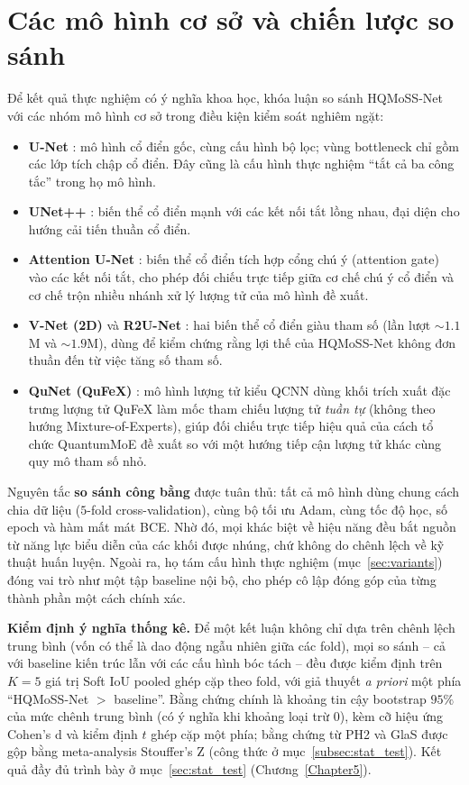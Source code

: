 \section{Các mô hình cơ sở và chiến lược so sánh}
Để kết quả thực nghiệm có ý nghĩa khoa học, khóa luận so sánh HQMoSS-Net với các nhóm mô hình cơ sở trong điều kiện kiểm soát nghiêm ngặt:
\begin{itemize}
    \item \textbf{U-Net} \cite{ronneberger2015unet}: mô hình cổ điển gốc, cùng cấu hình bộ lọc; vùng bottleneck chỉ gồm các lớp tích chập cổ điển. Đây cũng là cấu hình thực nghiệm ``tắt cả ba công tắc'' trong họ mô hình.
    \item \textbf{UNet++} \cite{zhou2018unetplusplus}: biến thể cổ điển mạnh với các kết nối tắt lồng nhau, đại diện cho hướng cải tiến thuần cổ điển.
    \item \textbf{Attention U-Net} \cite{oktay2018attention}: biến thể cổ điển tích hợp cổng chú ý (attention gate) vào các kết nối tắt, cho phép đối chiếu trực tiếp giữa cơ chế chú ý cổ điển và cơ chế trộn nhiều nhánh xử lý lượng tử của mô hình đề xuất.
    \item \textbf{V-Net (2D)} \cite{milletari2016vnet} và \textbf{R2U-Net} \cite{alom2018r2unet}: hai biến thể cổ điển giàu tham số (lần lượt $\sim\!1.1$M và $\sim\!1.9$M), dùng để kiểm chứng rằng lợi thế của HQMoSS-Net không đơn thuần đến từ việc tăng số tham số.
    \item \textbf{QuNet (QuFeX)} \cite{qufex2025}: mô hình lượng tử kiểu QCNN dùng khối trích xuất đặc trưng lượng tử QuFeX làm mốc tham chiếu lượng tử \emph{tuần tự} (không theo hướng Mixture-of-Experts), giúp đối chiếu trực tiếp hiệu quả của cách tổ chức QuantumMoE đề xuất so với một hướng tiếp cận lượng tử khác cùng quy mô tham số nhỏ.
\end{itemize}
Nguyên tắc \textbf{so sánh công bằng} được tuân thủ: tất cả mô hình dùng chung cách chia dữ liệu ($5$-fold cross-validation), cùng bộ tối ưu Adam, cùng tốc độ học, số epoch và hàm mất mát BCE. Nhờ đó, mọi khác biệt về hiệu năng đều bắt nguồn từ năng lực biểu diễn của các khối được nhúng, chứ không do chênh lệch về kỹ thuật huấn luyện. Ngoài ra, họ tám cấu hình thực nghiệm (mục~\ref{sec:variants}) đóng vai trò như một tập baseline nội bộ, cho phép cô lập đóng góp của từng thành phần một cách chính xác.

\textbf{Kiểm định ý nghĩa thống kê.} Để một kết luận không chỉ dựa trên chênh lệch trung bình (vốn có thể là dao động ngẫu nhiên giữa các fold), mọi so sánh -- cả với baseline kiến trúc lẫn với các cấu hình bóc tách -- đều được kiểm định trên $K=5$ giá trị Soft IoU pooled ghép cặp theo fold, với giả thuyết \emph{a priori} một phía ``HQMoSS-Net $>$ baseline''. Bằng chứng chính là khoảng tin cậy bootstrap $95\%$ của mức chênh trung bình (có ý nghĩa khi khoảng loại trừ $0$), kèm cỡ hiệu ứng Cohen's d và kiểm định $t$ ghép cặp một phía; bằng chứng từ PH2 và GlaS được gộp bằng meta-analysis Stouffer's Z (công thức ở mục~\ref{subsec:stat_test}). Kết quả đầy đủ trình bày ở mục~\ref{sec:stat_test} (Chương~\ref{Chapter5}).

